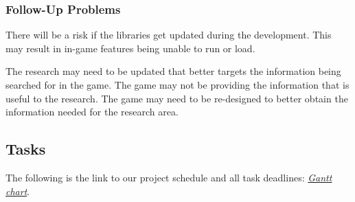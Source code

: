 \documentclass{article}
\begin{document}
\subsubsection{Follow-Up Problems}
There will be a risk if the libraries get updated during the development. This may result in in-game features being unable to run or load.

The research may need to be updated that better targets the information being searched for in the game. The game may not be providing the information that is useful to the research. The game may need to be re-designed to better obtain the information needed for the research area.


\subsection{Tasks}
The following is the link to our project schedule and all task deadlines:
\href{https://github.com/brandonduong/Farming-Matters/blob/main/docs/Schedule/FarmingMattersSchedule.pdf}{\textit{Gantt chart}}.
\end{document}
